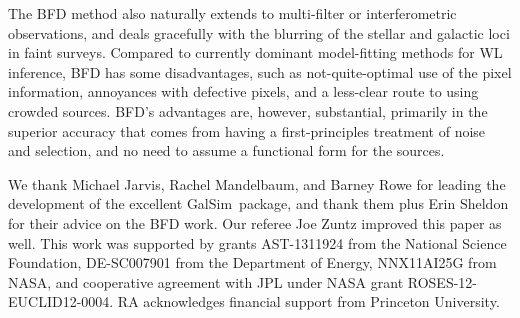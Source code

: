 \documentclass[11pt,preprint,flushrt]{aastex}
\newcommand{\galsim}{{\sc GalSim}}
\newcommand\edit[1]{#1}
\begin{document}
The BFD method also naturally extends to multi-filter or
interferometric observations, and deals gracefully with the blurring
of the stellar and galactic loci in faint surveys.  Compared to
currently dominant model-fitting methods for WL inference, BFD has some
disadvantages, such as not-quite-optimal use of the pixel information,
annoyances with defective pixels, and a less-clear route to using
crowded sources.  BFD's advantages are, however, substantial, primarily in the superior accuracy
that comes from having a first-principles treatment of noise and
selection, and no need to assume a functional form for the sources.

\acknowledgments
We thank Michael Jarvis, Rachel Mandelbaum, and Barney Rowe for
leading the development of the excellent \galsim\ package, and thank
them plus Erin Sheldon for their advice on the BFD work.  \edit{Our
  referee Joe Zuntz improved this paper as well.} This work
was supported by grants AST-1311924 from the National Science Foundation,
DE-SC007901 from the Department of Energy, NNX11AI25G from NASA, and
cooperative agreement with JPL under NASA grant ROSES-12-EUCLID12-0004.
RA acknowledges financial support from Princeton University.
\end{document}
